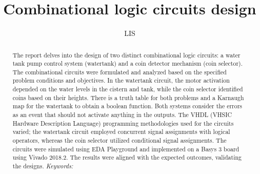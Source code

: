 \documentclass{article}
\begin{document}
\renewcommand{\footrulewidth}{1pt}
\renewcommand{\tablename}{Tabla}

\author{}
\title{Combinational logic circuits design}
\date{LIS}
\maketitle

\begin{abstract}
	The report delves into the design of two distinct combinational logic circuits: a water tank pump control system (watertank) and a coin detector mechanism (coin selector). The combinational circuits were formulated and analyzed based on the specified problem conditions and objectives. In the watertank circuit, the motor activation depended on the water levels in the cistern and tank, while the coin selector identified coins based on their heights. There is a truth table for both problems and a Karnaugh map for the watertank to obtain a boolean function. Both systems consider the errors as an event that should not activate anything in the outputs. The VHDL (VHSIC Hardware Description Language) programming methodologies used for the circuits varied; the watertank circuit employed concurrent signal assignments with logical operators, whereas the coin selector utilized conditional signal assignments. The circuits were simulated using EDA Playground and implemented on a Basys 3 board using Vivado 2018.2. The results were aligned with the expected outcomes, validating the designs.
	\textit{Keywords:}
\end{abstract}
\end{document}
